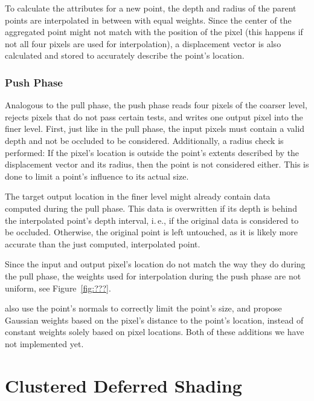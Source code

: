 To calculate the attributes for a new point, the depth and radius of the parent points are interpolated in between with equal weights. Since the center of the aggregated point might not match with the position of the pixel (this happens if not all four pixels are used for interpolation), a displacement vector is also calculated and stored to accurately describe the point's location.


\subsubsection{Push Phase}

Analogous to the pull phase, the push phase reads four pixels of the coarser level, rejects pixels that do not pass certain tests, and writes one output pixel into the finer level. First, just like in the pull phase, the input pixels must contain a valid depth and not be occluded to be considered. Additionally, a radius check is performed: If the pixel's location is outside the point's extents described by the displacement vector and its radius, then the point is not considered either. This is done to limit a point's influence to its actual size.

The target output location in the finer level might already contain data computed during the pull phase. This data is overwritten if its depth is behind the interpolated point's depth interval, i.\,e., if the original data is considered to be occluded. Otherwise, the original point is left untouched, as it is likely more accurate than the just computed, interpolated point.

Since the input and output pixel's location do not match the way they do during the pull phase, the weights used for interpolation during the push phase are not uniform, see Figure~\ref{fig:???}.


 \citet{Marroquim:2007:reconstruction} also use the point's normals to correctly limit the point's size, and \citet{Marroquim:2008:reconstruction2} propose Gaussian weights based on the pixel's distance to the point's location, instead of constant weights solely based on pixel locations. Both of these additions we have not implemented yet.



\section{Clustered Deferred Shading}
\label{sec:concept:clusteredShading}

